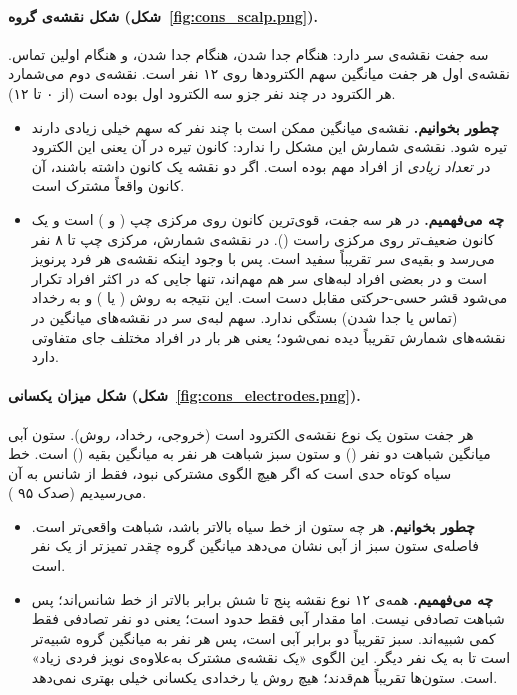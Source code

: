 \paragraph{شکل نقشه‌ی گروه (شکل~\ref{fig:cons_scalp.png}).} سه جفت نقشه‌ی سر دارد:  هنگام جدا شدن،  هنگام جدا شدن، و  هنگام اولین تماس. نقشه‌ی اول هر جفت میانگین سهم الکترودها روی ۱۲ نفر است. نقشه‌ی دوم می‌شمارد هر الکترود در چند نفر جزو سه الکترود اول بوده است (از ۰ تا ۱۲).
\begin{itemize}
\item \textbf{چطور بخوانیم.} نقشه‌ی میانگین ممکن است با چند نفر که سهم خیلی زیادی دارند تیره شود. نقشه‌ی شمارش این مشکل را ندارد: کانون تیره در آن یعنی این الکترود در \emph{تعداد زیادی} از افراد مهم بوده است. اگر دو نقشه یک کانون داشته باشند، آن کانون واقعاً مشترک است.
\item \textbf{چه می‌فهمیم.} در هر سه جفت، قوی‌ترین کانون روی مرکزی چپ ( و ) است و یک کانون ضعیف‌تر روی مرکزی راست (). در نقشه‌ی شمارش، مرکزی چپ تا ۸ نفر می‌رسد و بقیه‌ی سر تقریباً سفید است. پس با وجود اینکه نقشه‌ی هر فرد پرنویز است و در بعضی افراد لبه‌های سر هم مهم‌اند، تنها جایی که در اکثر افراد تکرار می‌شود قشر حسی-حرکتی مقابل دست است. این نتیجه به روش ( یا ) و به رخداد (تماس یا جدا شدن) بستگی ندارد. سهم لبه‌ی سر در نقشه‌های میانگین در نقشه‌های شمارش تقریباً دیده نمی‌شود؛ یعنی هر بار در افراد مختلف جای متفاوتی دارد.
\end{itemize}


\paragraph{شکل میزان یکسانی (شکل~\ref{fig:cons_electrodes.png}).} هر جفت ستون یک نوع نقشه‌ی الکترود است (خروجی، رخداد، روش). ستون آبی میانگین شباهت دو نفر () و ستون سبز شباهت هر نفر به میانگین بقیه () است. خط سیاه کوتاه حدی است که اگر هیچ الگوی مشترکی نبود، فقط از شانس به آن می‌رسیدیم (صدک ۹۵ ).
\begin{itemize}
\item \textbf{چطور بخوانیم.} هر چه ستون از خط سیاه بالاتر باشد، شباهت واقعی‌تر است. فاصله‌ی ستون سبز از آبی نشان می‌دهد میانگین گروه چقدر تمیزتر از یک نفر است.
\item \textbf{چه می‌فهمیم.} همه‌ی ۱۲ نوع نقشه پنج تا شش برابر بالاتر از خط شانس‌اند؛ پس شباهت تصادفی نیست. اما مقدار آبی فقط حدود  است؛ یعنی دو نفر تصادفی فقط کمی شبیه‌اند. سبز تقریباً دو برابر آبی است، پس هر نفر به میانگین گروه شبیه‌تر است تا به یک نفر دیگر. این الگوی «یک نقشه‌ی مشترک به‌علاوه‌ی نویز فردی زیاد» است. ستون‌ها تقریباً هم‌قدند؛ هیچ روش یا رخدادی یکسانی خیلی بهتری نمی‌دهد.
\end{itemize}

